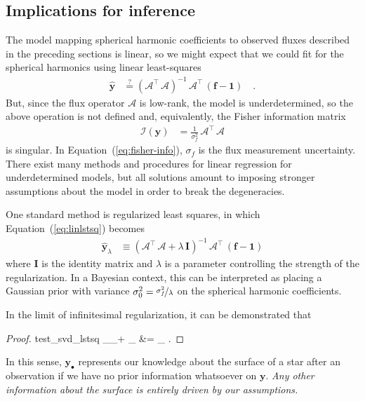 \documentclass[modern]{aastex62}
\begin{document}
\subsection{Implications for inference}
%
The model mapping spherical harmonic coefficients to observed fluxes described
in the preceding sections is linear, so we might expect that we could fit
for the spherical harmonics using linear least-squares
%
\begin{align}
    \label{eq:linlstsq}
    \hat{\mathbf{y}} & \stackrel{?}{=}
    \left(\pmb{\mathcal{A}}^\top\,\pmb{\mathcal{A}}\right)^{-1}\,\pmb{\mathcal{A}}^\top\,\left(\mathbf{f} - \mathbf{1}\right)
    \quad.
\end{align}
%
But, since the flux operator $\pmb{\mathcal{A}}$ is low-rank, the model is
underdetermined, so the above operation is not defined and, equivalently,
the Fisher information matrix
%
\begin{align}
    \label{eq:fisher-info}
    \pmb{\mathcal{I}}(\mathbf{y}) & = \frac{1}{\sigma_f^2} \, \pmb{\mathcal{A}}^\top\,\pmb{\mathcal{A}}
\end{align}
%
is singular.
In Equation~(\ref{eq:fisher-info}), $\sigma_f$ is the flux measurement uncertainty.
There exist many methods and procedures for linear regression for underdetermined
models, but all solutions amount to imposing stronger assumptions about the
model in order to break the degeneracies.

One standard method is regularized least squares, in which
Equation~(\ref{eq:linlstsq}) becomes
%
\begin{align}
    \hat{\mathbf{y}}_\lambda & \equiv
    \left(\pmb{\mathcal{A}}^\top\,\pmb{\mathcal{A}} + \lambda\,\mathbf{I}\right)^{-1}\,\pmb{\mathcal{A}}^\top\,\left(\mathbf{f} - \mathbf{1}\right)
\end{align}
%
where $\mathbf{I}$ is the identity matrix and $\lambda$ is a parameter
controlling the strength of the regularization.
In a Bayesian context, this can be interpreted as placing a Gaussian prior
with variance $\sigma_0^{2} = \nicefrac{\sigma_f^2}{\lambda}$ on the spherical harmonic coefficients.

In the limit of infinitesimal regularization, it can be demonstrated
\citep[see][for example]{Hogg2021} that
%
\begin{proof}{test_svd_lstsq}
    \label{eq:inference}
    \lim_{\lambda {}_+} _\lambda
    &= _\bullet
    \quad.
\end{proof}
%
In this sense, $\mathbf{y}_\bullet$ represents our knowledge about the
surface of a star after an observation if we have no prior information
whatsoever on $\mathbf{y}$.
\emph{Any other information about the surface is entirely driven by our assumptions.}%
\end{document}
